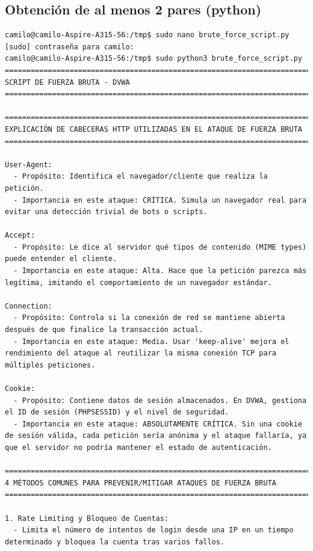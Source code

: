 \documentclass[letter,12pt]{article}
\begin{document}
\subsection{Obtención de al menos 2 pares (python)}
\begin{verbatim}
camilo@camilo-Aspire-A315-56:/tmp$ sudo nano brute_force_script.py
[sudo] contraseña para camilo: 
camilo@camilo-Aspire-A315-56:/tmp$ sudo python3 brute_force_script.py
================================================================================
SCRIPT DE FUERZA BRUTA - DVWA
================================================================================

================================================================================
EXPLICACIÓN DE CABECERAS HTTP UTILIZADAS EN EL ATAQUE DE FUERZA BRUTA
================================================================================

User-Agent:
  - Propósito: Identifica el navegador/cliente que realiza la petición.
  - Importancia en este ataque: CRÍTICA. Simula un navegador real para evitar una detección trivial de bots o scripts.

Accept:
  - Propósito: Le dice al servidor qué tipos de contenido (MIME types) puede entender el cliente.
  - Importancia en este ataque: Alta. Hace que la petición parezca más legítima, imitando el comportamiento de un navegador estándar.

Connection:
  - Propósito: Controla si la conexión de red se mantiene abierta después de que finalice la transacción actual.
  - Importancia en este ataque: Media. Usar 'keep-alive' mejora el rendimiento del ataque al reutilizar la misma conexión TCP para múltiples peticiones.

Cookie:
  - Propósito: Contiene datos de sesión almacenados. En DVWA, gestiona el ID de sesión (PHPSESSID) y el nivel de seguridad.
  - Importancia en este ataque: ABSOLUTAMENTE CRÍTICA. Sin una cookie de sesión válida, cada petición sería anónima y el ataque fallaría, ya que el servidor no podría mantener el estado de autenticación.

================================================================================
4 MÉTODOS COMUNES PARA PREVENIR/MITIGAR ATAQUES DE FUERZA BRUTA
================================================================================

1. Rate Limiting y Bloqueo de Cuentas:
  - Limita el número de intentos de login desde una IP en un tiempo determinado y bloquea la cuenta tras varios fallos.



\end{verbatim}
\end{document}
